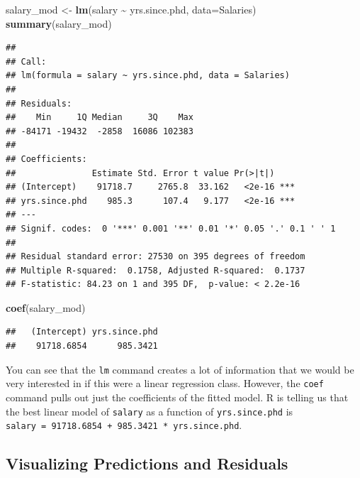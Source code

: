 \documentclass[
]{article}
\newenvironment{Shaded}{\begin{snugshade}}{\end{snugshade}}
\newcommand{\AttributeTok}[1]{\textcolor[rgb]{0.13,0.29,0.53}{#1}}
\newcommand{\FunctionTok}[1]{\textcolor[rgb]{0.13,0.29,0.53}{\textbf{#1}}}
\newcommand{\NormalTok}[1]{#1}
\newcommand{\OtherTok}[1]{\textcolor[rgb]{0.56,0.35,0.01}{#1}}
\newcommand{\SpecialCharTok}[1]{\textcolor[rgb]{0.81,0.36,0.00}{\textbf{#1}}}
\begin{document}
\begin{Shaded}
\begin{Highlighting}[]
\NormalTok{salary\_mod }\OtherTok{\textless{}{-}} \FunctionTok{lm}\NormalTok{(salary }\SpecialCharTok{\textasciitilde{}}\NormalTok{ yrs.since.phd, }\AttributeTok{data=}\NormalTok{Salaries)}
\FunctionTok{summary}\NormalTok{(salary\_mod)}
\end{Highlighting}
\end{Shaded}

\begin{verbatim}
## 
## Call:
## lm(formula = salary ~ yrs.since.phd, data = Salaries)
## 
## Residuals:
##    Min     1Q Median     3Q    Max 
## -84171 -19432  -2858  16086 102383 
## 
## Coefficients:
##               Estimate Std. Error t value Pr(>|t|)    
## (Intercept)    91718.7     2765.8  33.162   <2e-16 ***
## yrs.since.phd    985.3      107.4   9.177   <2e-16 ***
## ---
## Signif. codes:  0 '***' 0.001 '**' 0.01 '*' 0.05 '.' 0.1 ' ' 1
## 
## Residual standard error: 27530 on 395 degrees of freedom
## Multiple R-squared:  0.1758, Adjusted R-squared:  0.1737 
## F-statistic: 84.23 on 1 and 395 DF,  p-value: < 2.2e-16
\end{verbatim}

\begin{Shaded}
\begin{Highlighting}[]
\FunctionTok{coef}\NormalTok{(salary\_mod)}
\end{Highlighting}
\end{Shaded}

\begin{verbatim}
##   (Intercept) yrs.since.phd 
##    91718.6854      985.3421
\end{verbatim}

You can see that the \texttt{lm} command creates a lot of information
that we would be very interested in if this were a linear regression
class. However, the \texttt{coef} command pulls out just the
coefficients of the fitted model. R is telling us that the best linear
model of \texttt{salary} as a function of \texttt{yrs.since.phd} is
\texttt{salary\ =\ 91718.6854\ +\ 985.3421\ *\ yrs.since.phd}.

\hypertarget{visualizing-predictions-and-residuals}{%
\subsection{Visualizing Predictions and
Residuals}\label{visualizing-predictions-and-residuals}}
\end{document}
